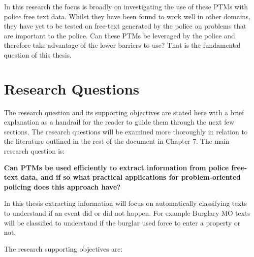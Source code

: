 In this research the focus is broadly on investigating the use of these PTMs with police free text data. Whilst they have been found to work well in other domains, they have yet to be tested on free-text generated by the police on problems that are important to the police. Can these PTMs be leveraged by the police and therefore take advantage of the lower barriers to use? That is the fundamental question of this thesis.



\section{Research Questions}

The research question and its supporting objectives are stated here with a brief explanation as a handrail for the reader to guide them through the next few sections. The research questions will be examined more thoroughly in relation to the literature outlined in the rest of the document in Chapter 7. The main research question is:

\textbf{Can PTMs be used efficiently to extract information from police free-text data, and if so what practical applications for problem-oriented policing does this approach have?}

In this thesis extracting information will focus on automatically classifying texts to understand if an event did or did not happen. For example Burglary MO texts will be classified to understand if the burglar used force to enter a property or not.

The research supporting objectives are:

